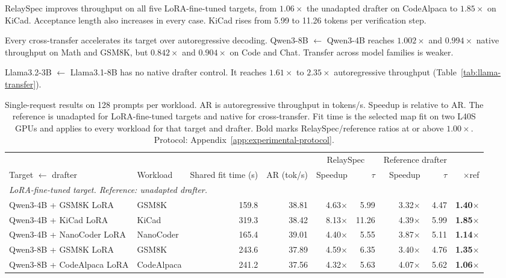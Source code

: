 RelaySpec improves throughput on all five LoRA-fine-tuned targets, from $1.06\times$ the unadapted drafter on CodeAlpaca to $1.85\times$ on KiCad. Acceptance length also increases in every case. KiCad rises from 5.99 to 11.26 tokens per verification step.

Every cross-transfer accelerates its target over autoregressive decoding. Qwen3-8B $\leftarrow$ Qwen3-4B reaches $1.002\times$ and $0.994\times$ native throughput on Math and GSM8K, but $0.842\times$ and $0.904\times$ on Code and Chat. Transfer across model families is weaker.

Llama3.2-3B $\leftarrow$ Llama3.1-8B has no native drafter control. It reaches $1.61\times$ to $2.35\times$ autoregressive throughput (Table~\ref{tab:llama-transfer}).

\begin{table}[t]
\centering
\caption{Single-request results on 128 prompts per workload. AR is autoregressive throughput in tokens/s. Speedup is relative to AR. The reference is unadapted for LoRA-fine-tuned targets and native for cross-transfer. Fit time is the selected map fit on two L40S GPUs and applies to every workload for that target and drafter. Bold marks RelaySpec/reference ratios at or above $1.00\times$. Protocol: Appendix~\ref{app:experimental-protocol}.}
\label{tab:main}
\scriptsize
\setlength{\tabcolsep}{3.2pt}
\begin{tabular}{llrrrrrrr}
\toprule
& & & & \multicolumn{2}{c}{RelaySpec} & \multicolumn{2}{c}{Reference drafter} & \\
\cmidrule(lr){5-6}\cmidrule(lr){7-8}
Target $\leftarrow$ drafter & Workload & Shared fit time (s) & AR (tok/s) & Speedup & $\tau$ & Speedup & $\tau$ & $\times$ref \\
\midrule
\multicolumn{9}{l}{\emph{LoRA-fine-tuned target. Reference: unadapted drafter.}} \\
Qwen3-4B + GSM8K LoRA & GSM8K & 159.8 & 38.81 & 4.63$\times$ & 5.99 & 3.32$\times$ & 4.47 & \textbf{1.40$\times$} \\
Qwen3-4B + KiCad LoRA & KiCad & 319.3 & 38.42 & 8.13$\times$ & 11.26 & 4.39$\times$ & 5.99 & \textbf{1.85$\times$} \\
Qwen3-4B + NanoCoder LoRA & NanoCoder & 165.4 & 39.01 & 4.40$\times$ & 5.55 & 3.87$\times$ & 5.11 & \textbf{1.14$\times$} \\
Qwen3-8B + GSM8K LoRA & GSM8K & 243.6 & 37.89 & 4.59$\times$ & 6.35 & 3.40$\times$ & 4.76 & \textbf{1.35$\times$} \\
Qwen3-8B + CodeAlpaca LoRA & CodeAlpaca & 241.2 & 37.56 & 4.32$\times$ & 5.63 & 4.07$\times$ & 5.62 & \textbf{1.06$\times$} \\

\end{tabular}
\end{table}
